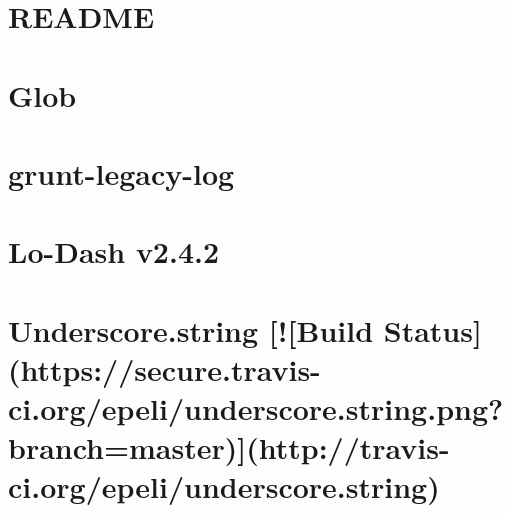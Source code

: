 \documentclass[twoside]{book}
\newcommand{\+}{\discretionary{\mbox{\scriptsize$\hookleftarrow$}}{}{}}
\begin{document}
\chapter{R\+E\+A\+D\+M\+E}
\label{md__c_1__users_martin__documents__git_hub_visual_studio__bachelor__wis_r__wis_r_node_modules_gru68fbe236eebd567f525182bd4c6c65e7}
\hypertarget{md__c_1__users_martin__documents__git_hub_visual_studio__bachelor__wis_r__wis_r_node_modules_gru68fbe236eebd567f525182bd4c6c65e7}{}

\chapter{Glob}
\label{md__c_1__users_martin__documents__git_hub_visual_studio__bachelor__wis_r__wis_r_node_modules_gruf849be00fa63124ad812b8957657f07f}
\hypertarget{md__c_1__users_martin__documents__git_hub_visual_studio__bachelor__wis_r__wis_r_node_modules_gruf849be00fa63124ad812b8957657f07f}{}

\chapter{grunt-\/legacy-\/log}
\label{md__c_1__users_martin__documents__git_hub_visual_studio__bachelor__wis_r__wis_r_node_modules_grucd9067ff4b9da36b78667d9ded8444e9}
\hypertarget{md__c_1__users_martin__documents__git_hub_visual_studio__bachelor__wis_r__wis_r_node_modules_grucd9067ff4b9da36b78667d9ded8444e9}{}

\chapter{Lo-\/\+Dash v2.4.2}
\label{md__c_1__users_martin__documents__git_hub_visual_studio__bachelor__wis_r__wis_r_node_modules_gru5b02926333434d30db594856ca731729}
\hypertarget{md__c_1__users_martin__documents__git_hub_visual_studio__bachelor__wis_r__wis_r_node_modules_gru5b02926333434d30db594856ca731729}{}

\chapter{Underscore.\+string \mbox{[}!\mbox{[}Build Status\mbox{]}(https\+://secure.travis-\/ci.org/epeli/underscore.string.\+png?branch=master)\mbox{]}(http\+://travis-\/ci.org/epeli/underscore.string)}
\label{md__c_1__users_martin__documents__git_hub_visual_studio__bachelor__wis_r__wis_r_node_modules_grubeec0d9feee691af819d7675dc2142f9}
\hypertarget{md__c_1__users_martin__documents__git_hub_visual_studio__bachelor__wis_r__wis_r_node_modules_grubeec0d9feee691af819d7675dc2142f9}{}

\end{document}
